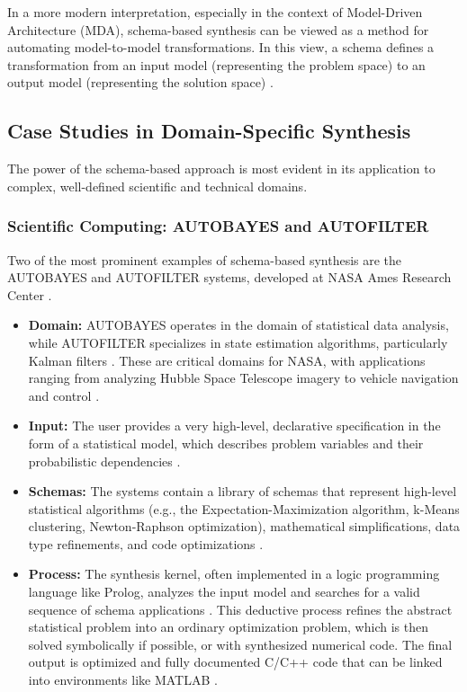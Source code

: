 \documentclass[12pt, a4paper]{report}
\begin{document}
In a more modern interpretation, especially in the context of Model-Driven Architecture (MDA), schema-based synthesis can be viewed as a method for automating model-to-model transformations. In this view, a schema defines a transformation from an input model (representing the problem space) to an output model (representing the solution space) \citep{flener2004schema}.

\subsection{Case Studies in Domain-Specific Synthesis}
The power of the schema-based approach is most evident in its application to complex, well-defined scientific and technical domains.

\subsubsection{Scientific Computing: AUTOBAYES and AUTOFILTER}
Two of the most prominent examples of schema-based synthesis are the AUTOBAYES and AUTOFILTER systems, developed at NASA Ames Research Center \citep{fischer2003autobayes}.
\begin{itemize}
    \item \textbf{Domain:} AUTOBAYES operates in the domain of statistical data analysis, while AUTOFILTER specializes in state estimation algorithms, particularly Kalman filters \citep{fischer2003autobayes}. These are critical domains for NASA, with applications ranging from analyzing Hubble Space Telescope imagery to vehicle navigation and control \citep{fischer2003autobayes}.
    \item \textbf{Input:} The user provides a very high-level, declarative specification in the form of a statistical model, which describes problem variables and their probabilistic dependencies \citep{fischer2003autobayes}.
    \item \textbf{Schemas:} The systems contain a library of schemas that represent high-level statistical algorithms (e.g., the Expectation-Maximization algorithm, k-Means clustering, Newton-Raphson optimization), mathematical simplifications, data type refinements, and code optimizations \citep{fischer2003autobayes}.
    \item \textbf{Process:} The synthesis kernel, often implemented in a logic programming language like Prolog, analyzes the input model and searches for a valid sequence of schema applications \citep{fischer2003autobayes}. This deductive process refines the abstract statistical problem into an ordinary optimization problem, which is then solved symbolically if possible, or with synthesized numerical code. The final output is optimized and fully documented C/C++ code that can be linked into environments like MATLAB \citep{fischer2003autobayes}.
\end{itemize}
\end{document}
